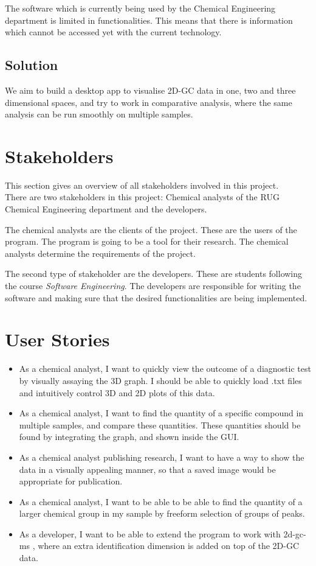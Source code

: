 \documentclass{article}
\begin{document}
The software which is currently being used by the Chemical Engineering department is limited in functionalities. This means that there is information which cannot be accessed yet with the current technology. 

\subsection*{Solution}
We aim to build a desktop app to visualise 2D-GC data in one, two and three dimensional spaces, and try to work in comparative analysis, where the same analysis can be run smoothly on multiple samples. 

\section{Stakeholders}

This section gives an overview of all stakeholders involved in this project. \\

\noindent There are two stakeholders in this project: Chemical analysts of the RUG Chemical Engineering department and the developers.

The chemical analysts are the clients of the project. These are the users of the program. The program is going to be a tool for their research. The chemical analysts determine the requirements of the project.

The second type of stakeholder are the developers. These are students following the course \textit{Software Engineering}. The developers are responsible for writing the software and making sure that the desired functionalities are being implemented.

\section{User Stories}
\begin{itemize}
	\item As a chemical analyst, I want to quickly view the outcome of a diagnostic test by visually assaying the 3D graph. I should be able to quickly load .txt files and intuitively control 3D and 2D plots of this data.
	\item As a chemical analyst, I want to find the quantity of a specific compound in multiple samples, and compare these quantities. These quantities should be found by integrating the graph, and shown inside the GUI.
	\item As a chemical analyst publishing research, I want to have a way to show the data in a visually appealing manner, so that a saved image would be appropriate for publication. 
	\item As a chemical analyst, I want to be able to be able to find the quantity of a larger chemical group in my sample by freeform selection of groups of peaks. 
	\item As a developer, I want to be able to extend the program to work with \acrfull{2d-gc-ms} , where an extra identification dimension is added on top of the 2D-GC data. 
\end{itemize}
\end{document}
